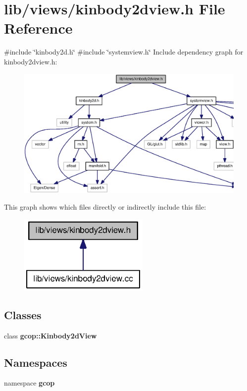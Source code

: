 \section{lib/views/kinbody2dview.h \-File \-Reference}
\label{kinbody2dview_8h}
{\ttfamily \#include \char`\"{}kinbody2d.\-h\char`\"{}}\*
{\ttfamily \#include \char`\"{}systemview.\-h\char`\"{}}\*
\-Include dependency graph for kinbody2dview.\-h\-:
\nopagebreak
\begin{figure}[H]
\begin{center}
\leavevmode
\includegraphics[width=350pt]{kinbody2dview_8h__incl}
\end{center}
\end{figure}
\-This graph shows which files directly or indirectly include this file\-:
\nopagebreak
\begin{figure}[H]
\begin{center}
\leavevmode
\includegraphics[width=180pt]{kinbody2dview_8h__dep__incl}
\end{center}
\end{figure}
\subsection*{\-Classes}
\begin{DoxyCompactItemize}
\item 
class {\bf gcop\-::\-Kinbody2d\-View}
\end{DoxyCompactItemize}
\subsection*{\-Namespaces}
\begin{DoxyCompactItemize}
\item 
namespace {\bf gcop}
\end{DoxyCompactItemize}
